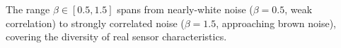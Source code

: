 The range $\beta \in [0.5, 1.5]$ spans from nearly-white noise ($\beta = 0.5$, weak correlation)
to strongly correlated noise ($\beta = 1.5$, approaching brown noise),
covering the diversity of real sensor characteristics.

